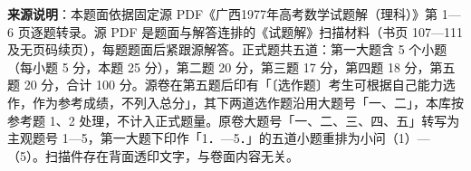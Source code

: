 


\begin{gktip}
\textbf{来源说明}：本题面依据固定源 PDF《广西1977年高考数学试题解（理科）》第 1—6 页逐题转录。源 PDF 是题面与解答连排的《试题解》扫描材料（书页 107—111 及无页码续页），每题题面后紧跟源解答。正式题共五道：第一大题含 5 个小题（每小题 5 分，本题 25 分），第二题 20 分，第三题 17 分，第四题 18 分，第五题 20 分，合计 100 分。源卷在第五题后印有「〔选作题〕考生可根据自己能力选作，作为参考成绩，不列入总分」，其下两道选作题沿用大题号「一、二」，本库按参考题 1、2 处理，不计入正式题量。原卷大题号「一、二、三、四、五」转写为主观题号 1—5，第一大题下印作「1．—5．」的五道小题重排为小问（1）—（5）。扫描件存在背面透印文字，与卷面内容无关。
\end{gktip}

\par\medskip

